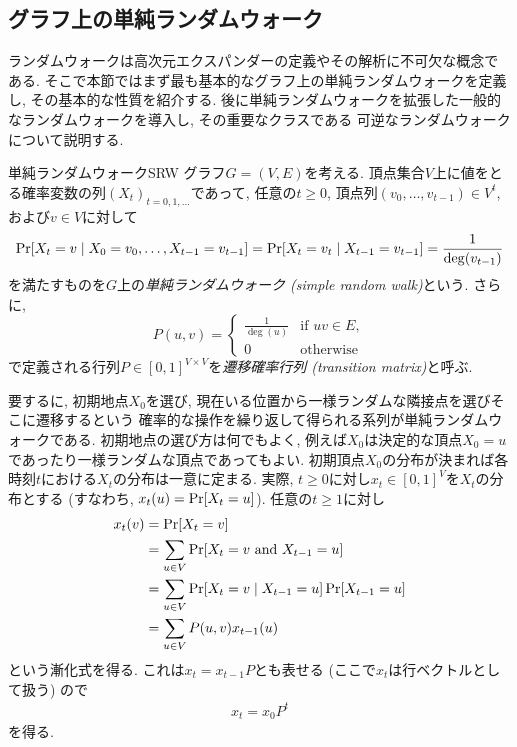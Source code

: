 \subsection{グラフ上の単純ランダムウォーク}
ランダムウォークは高次元エクスパンダーの定義やその解析に不可欠な概念である.
そこで本節ではまず最も基本的なグラフ上の単純ランダムウォークを定義し, その基本的な性質を紹介する.
後に単純ランダムウォークを拡張した一般的なランダムウォークを導入し, その重要なクラスである
可逆なランダムウォークについて説明する.
%
\begin{definition}{単純ランダムウォーク}{SRW}
  グラフ$G=(V,E)$を考える.
  頂点集合$V$上に値をとる確率変数の列$(X_t)_{t=0,1,\dots}$であって,
  任意の$t\ge 0$, 頂点列$(v_0,\dots,v_{t-1})\in V^t$, および$v\in V$に対して
  \[
    \Pr\sbra*{ X_t = v \condition X_0=v_0,\dots,X_{t-1} = v_{t-1} } = \Pr\sbra*{ X_t = v_t \condition X_{t-1} = v_{t-1}} = \frac{1}{\deg(v_{t-1})}
  \]
  を満たすものを$G$上の\emph{単純ランダムウォーク (simple random walk)}という.
  さらに,
  \[
    P(u,v) = \begin{cases}
      \frac{1}{\deg(u)}	& \text{if }uv\in E,\\
      0 & \text{otherwise}
    \end{cases}
  \]
  で定義される行列$P \in [0,1]^{V\times V}$を\emph{遷移確率行列 (transition matrix)}と呼ぶ.
\end{definition}
%
要するに, 初期地点$X_0$を選び, 現在いる位置から一様ランダムな隣接点を選びそこに遷移するという
確率的な操作を繰り返して得られる系列が単純ランダムウォークである.
初期地点の選び方は何でもよく,
例えば$X_0$は決定的な頂点$X_0=u$であったり一様ランダムな頂点であってもよい.
%
初期頂点$X_0$の分布が決まれば各時刻$t$における$X_t$の分布は一意に定まる.
実際, $t\ge 0$に対し$x_t \in [0,1]^{V}$を$X_t$の分布とする
  (すなわち, $x_t(u) = \Pr\sbra*{X_t = u}$).
任意の$t\ge 1$に対し
\begin{align*}
  x_t(v) &= \Pr\sbra*{X_t = v} \\
    &= \sum_{u\in V}\Pr\sbra*{ X_t = v \tand X_{t-1} = u} \\
    &= \sum_{u\in V}\Pr\sbra*{ X_t = v \condition X_{t-1} = u} \Pr\sbra*{X_{t-1} = u}  \\
    &= \sum_{u\in V} P(u,v) x_{t-1}(u)
\end{align*}
という漸化式を得る.
これは$x_{t} = x_{t-1} P$とも表せる (ここで$x_t$は行ベクトルとして扱う) ので
\begin{align}
  x_t = x_0 P^t \label{eq:x_t SRW}
\end{align}
を得る.

